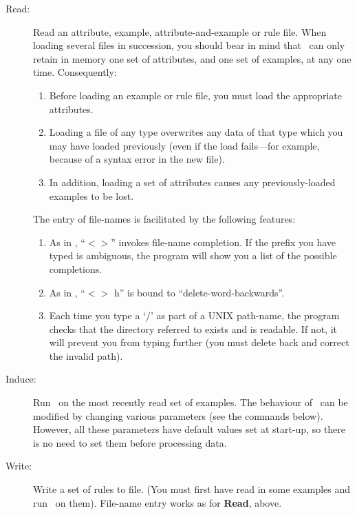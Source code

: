 \begin{description}
\item[Read:] Read an attribute, example, attribute-and-example or rule
file.  When loading several files in succession, you should bear in
mind that \CN\ can only retain in memory one set of attributes, and 
one set of examples, at any one time.  Consequently:

  \begin{enumerate}
   \item Before loading an example or rule file, you must load the appropriate
         attributes.
   \item Loading a file of any type overwrites any data of that type
         which you may have loaded previously (even if the load 
         fails---for example, because of a syntax error in the new file).
   \item In addition, loading a set of attributes causes any previously-loaded
         examples to be lost.  
  \end{enumerate}

   The entry of file-names is facilitated by the following features:
  \begin{enumerate}
    \item As in \emacs, ``$<$\tab$>$'' invokes file-name completion.  If
         the prefix you have typed
        is ambiguous, the program will show you a list of
         the possible completions.

    \item As in \emacs, ``$<$\esc$>$ h'' is bound to
           ``delete-word-backwards''.
  
    \item
    Each time you type a `/' as part of a UNIX path-name, the
    program checks that the directory referred to exists and is readable.
     If not, it will prevent you from typing further (you must delete
    back and correct the invalid path).
 \end{enumerate}

\item[Induce:] Run \CN\ on the most recently read set
of examples.  The behaviour of \CN\ can be modified by changing
various parameters (see the commands below).  However, all these
parameters have default values set at start-up, so there is no
need to set them before processing data.

\item[Write:] Write a set of rules to file.  (You must first
have read in some examples and run \CN\ on them). File-name entry works
as for {\bf Read}, above.


\end{description}
